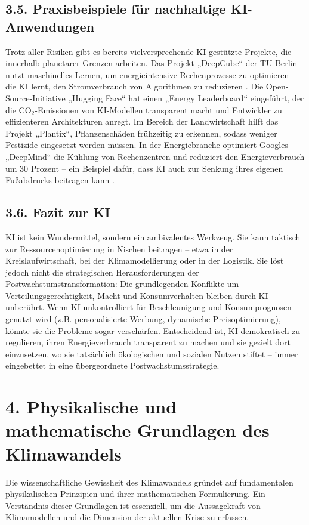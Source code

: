 \documentclass[12pt, a4paper]{article}
\begin{document}
	\subsection*{3.5. Praxisbeispiele für nachhaltige KI-Anwendungen}
	Trotz aller Risiken gibt es bereits vielversprechende KI-gestützte Projekte, die
	innerhalb planetarer Grenzen arbeiten. Das Projekt „DeepCube“ der TU Berlin nutzt
	maschinelles Lernen, um energieintensive Rechenprozesse zu optimieren – die KI lernt,
	den Stromverbrauch von Algorithmen zu reduzieren \cite{deepcube2024}. Die
	Open-Source-Initiative „Hugging Face“ hat einen „Energy Leaderboard“ eingeführt, der
	die CO$_2$-Emissionen von KI-Modellen transparent macht und Entwickler zu effizienteren
	Architekturen anregt. Im Bereich der Landwirtschaft hilft das Projekt „Plantix“,
	Pflanzenschäden frühzeitig zu erkennen, sodass weniger Pestizide eingesetzt werden
	müssen. In der Energiebranche optimiert Googles „DeepMind“ die Kühlung von Rechenzentren
	und reduziert den Energieverbrauch um 30 Prozent – ein Beispiel dafür, dass KI auch
	zur Senkung ihres eigenen Fußabdrucks beitragen kann \cite{deepmind2018}.
	
	\subsection*{3.6. Fazit zur KI}
	KI ist kein Wundermittel, sondern ein ambivalentes Werkzeug. Sie kann taktisch zur
	Ressourcenoptimierung in Nischen beitragen – etwa in der Kreislaufwirtschaft, bei
	der Klimamodellierung oder in der Logistik. Sie löst jedoch nicht die strategischen
	Herausforderungen der Postwachstumstransformation: Die grundlegenden Konflikte um
	Verteilungsgerechtigkeit, Macht und Konsumverhalten bleiben durch KI unberührt.
	Wenn KI unkontrolliert für Beschleunigung und Konsumprognosen genutzt wird (z.B.
	personalisierte Werbung, dynamische Preisoptimierung), könnte sie die Probleme sogar
	verschärfen. Entscheidend ist, KI demokratisch zu regulieren, ihren Energieverbrauch
	transparent zu machen und sie gezielt dort einzusetzen, wo sie tatsächlich ökologischen
	und sozialen Nutzen stiftet – immer eingebettet in eine übergeordnete Postwachstumsstrategie.
	
	\section*{4. Physikalische und mathematische Grundlagen des Klimawandels}
	
	Die wissenschaftliche Gewissheit des Klimawandels gründet auf fundamentalen physikalischen
	Prinzipien und ihrer mathematischen Formulierung. Ein Verständnis dieser Grundlagen ist
	essenziell, um die Aussagekraft von Klimamodellen und die Dimension der aktuellen Krise
	zu erfassen.
	
\end{document}
